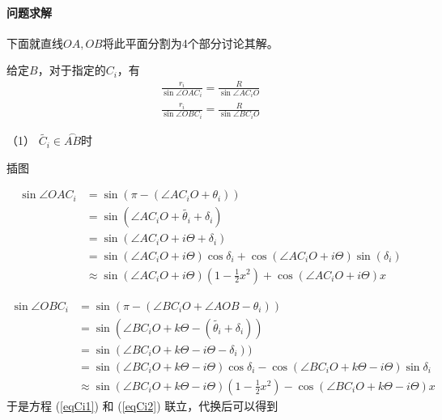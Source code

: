\documentclass[UTF8]{ctexart}
\begin{document}
\paragraph{问题求解}下面就直线$ OA,OB $将此平面分割为4个部分讨论其解。

给定\(B\)，对于指定的\(C_i\)，有
\begin{align}
    \frac{r_i}{\sin{\angle OAC_i}} = \frac{R}{\sin\angle AC_iO}\label{eqCi1} \\
    \frac{r_i}{\sin{\angle OBC_i}} = \frac{R}{\sin\angle BC_iO}\label{eqCi2}
\end{align}

（1） $ \tilde{C_i}\in\overset{\frown}{AB} $时

插图

\begin{align*}
    \sin \angle OAC_i & =\sin(\pi - (\angle AC_iO + \theta_i)            )                                     \\
                      & =\sin(\angle AC_iO + \tilde{\theta_i}+\delta_i)                                        \\
                      & =\sin(\angle AC_iO + i\Theta +\delta_i)                                                \\
                      & =\sin(\angle AC_iO + i\Theta)\cos\delta_i + \cos(\angle AC_iO + i\Theta)\sin(\delta_i) \\
                      & \approx \sin(\angle AC_iO + i\Theta)(1-\frac{1}{2}x^2) + \cos(\angle AC_iO + i\Theta)x
\end{align*}

\begin{align*}
    \sin\angle OBC_i & =\sin(\pi - (\angle BC_iO + \angle AOB - \theta_i))                                                            \\
                     & = \sin (\angle BC_iO + k\Theta - (\tilde{\theta_i}+\delta_i))                                                  \\
                     & = \sin (\angle BC_iO + k\Theta - i\Theta - \delta_i))                                                          \\
                     & =  \sin (\angle BC_iO + k\Theta - i\Theta)\cos \delta_i-\cos  (\angle BC_iO + k\Theta - i\Theta)\sin  \delta_i \\
                     & \approx \sin (\angle BC_iO + k\Theta - i\Theta)(1-\frac{1}{2}x^2)-\cos  (\angle BC_iO + k\Theta - i\Theta)x
\end{align*}
于是方程 (\ref{eqCi1}) 和 (\ref{eqCi2}) 联立，代换后可以得到
\end{document}
